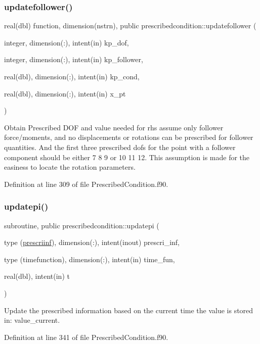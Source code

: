 \mbox{\label{namespaceprescribedcondition_a58a4332d8bb0ceb882aa3229085dce34}} 
\subsubsection{\texorpdfstring{updatefollower()}{updatefollower()}}
{\footnotesize\ttfamily real(dbl) function, dimension(nstrn), public prescribedcondition\+::updatefollower (\begin{DoxyParamCaption}\item[{integer, dimension(\+:), intent(in)}]{kp\+\_\+dof,  }\item[{integer, dimension(\+:), intent(in)}]{kp\+\_\+follower,  }\item[{real(dbl), dimension(\+:), intent(in)}]{kp\+\_\+cond,  }\item[{real(dbl), dimension(\+:), intent(in)}]{x\+\_\+pt }\end{DoxyParamCaption})}



Obtain Prescribed D\+OF and value needed for rhs assume only follower force/moments, and no displacements or rotations can be prescribed for follower quantities. And the first three prescribed dofs for the point with a follower component should be either 7 8 9 or 10 11 12. This assumption is made for the easiness to locate the rotation parameters. 



Definition at line 309 of file Prescribed\+Condition.\+f90.

\mbox{\label{namespaceprescribedcondition_a270714d4f42553a8f966674392dedbfe}} 
\subsubsection{\texorpdfstring{updatepi()}{updatepi()}}
{\footnotesize\ttfamily subroutine, public prescribedcondition\+::updatepi (\begin{DoxyParamCaption}\item[{type (\hyperlink{structprescribedcondition_1_1prescriinf}{prescriinf}), dimension(\+:), intent(inout)}]{prescri\+\_\+inf,  }\item[{type (timefunction), dimension(\+:), intent(in)}]{time\+\_\+fun,  }\item[{real(dbl), intent(in)}]{t }\end{DoxyParamCaption})}



Update the prescribed information based on the current time the value is stored in\+: value\+\_\+current. 



Definition at line 341 of file Prescribed\+Condition.\+f90.

